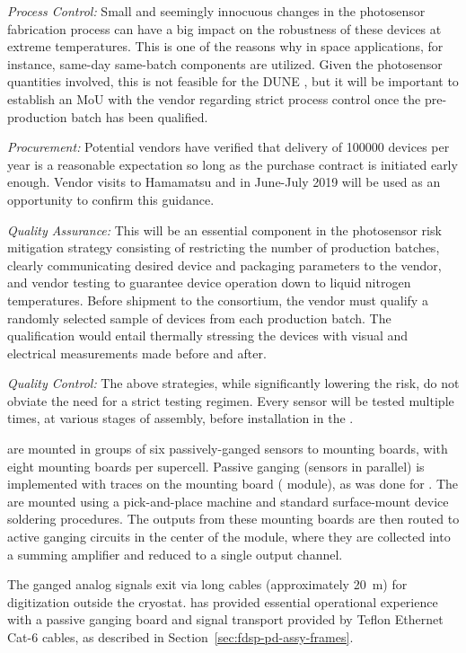 {\textit{Process Control:}} Small and seemingly innocuous
changes in the photosensor fabrication process can have a big impact on the robustness of these devices at extreme temperatures. This is one of the reasons why in space applications, for instance, same-day same-batch components are utilized. Given the photosensor quantities involved, this is not feasible for the DUNE , but
it will be important to establish an MoU with the vendor regarding 
strict process control once the pre-production batch has been qualified.

{\textit{Procurement:}} Potential vendors have verified that delivery of \num{100000} devices per year is a reasonable expectation so long as the purchase contract is initiated early enough.  Vendor visits to Hamamatsu and  in June-July 2019 will be used as an opportunity to confirm this guidance.

{\textit{Quality Assurance:}} This will be an essential component in the photosensor risk mitigation strategy consisting of restricting the number of production batches, clearly communicating desired device and packaging parameters to the vendor, and vendor testing to
guarantee device operation down to liquid nitrogen temperatures.
Before shipment to the consortium, the vendor 
must qualify a randomly selected sample of devices from each production batch. The qualification would entail thermally stressing the devices 
with visual and electrical measurements made before and after. 

{\textit{Quality Control:}} The above strategies, while significantly lowering the risk, do not obviate the need for a strict testing regimen. Every sensor will be tested multiple times, at various stages of assembly, before installation in the .

 are mounted in groups of six passively-ganged sensors to mounting boards, with eight mounting boards per supercell.  Passive ganging (sensors in parallel) is implemented with traces on the  mounting board ( module), 
as was done for .  The  are mounted using a pick-and-place machine and standard surface-mount device soldering procedures. The outputs from these mounting boards are then routed to active ganging circuits in the center of the  module, where they are collected into a summing amplifier and reduced to a single output channel.

The ganged analog signals exit via long cables (approximately \SI{20}{m}) for digitization outside the cryostat.
 has provided essential operational experience with a passive ganging board and signal transport provided by Teflon Ethernet Cat-6 cables, as described in Section~\ref{sec:fdsp-pd-assy-frames}.

